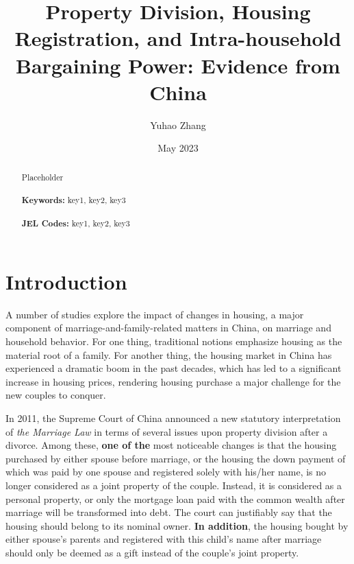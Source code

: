 \documentclass[11pt]{article}
\begin{document}
\begin{titlepage}
\title{Property Division, Housing Registration, and Intra-household Bargaining Power: Evidence from China}
\author{Yuhao Zhang}
\date{May 2023}
\maketitle
\begin{abstract}
\noindent Placeholder\\
\vspace{0in}\\
\noindent\textbf{Keywords:} key1, key2, key3\\
\vspace{0in}\\
\noindent\textbf{JEL Codes:} key1, key2, key3\\

\bigskip
\end{abstract}
\setcounter{page}{0}
\thispagestyle{empty}
\end{titlepage}
\pagebreak \newpage


\section{Introduction} \label{sec:intro}
A number of studies explore the impact of changes in housing, a major component of marriage-and-family-related matters in China, on marriage and household behavior. For one thing, traditional notions emphasize housing as the material root of a family. For another thing, the housing market in China has experienced a dramatic boom in the past decades, which has led to a significant increase in housing prices, rendering housing purchase a major challenge for the new couples to conquer.

In 2011, the Supreme Court of China announced a new statutory interpretation of \textit{the Marriage Law} in terms of several issues upon property division after a divorce. Among these, \textbf{one of the} most noticeable changes is that the housing purchased by either spouse before marriage, or the housing the down payment of which was paid by one spouse and registered solely with his/her name, is no longer considered as a joint property of the couple. Instead, it is considered as a personal property, or only the mortgage loan paid with the common wealth after marriage will be transformed into debt. The court can justifiably say that the housing should belong to its nominal owner. \textbf{In addition}, the housing bought by either spouse's parents and registered with this child's name after marriage should only be deemed as a gift instead of the couple's joint property.
\end{document}
